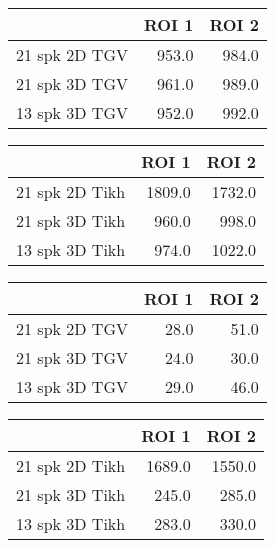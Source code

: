\begin{tabular}{lrr}
\toprule
{} &  ROI 1 &  ROI 2 \\
\midrule
21 spk 2D TGV &  953.0 &  984.0 \\
21 spk 3D TGV &  961.0 &  989.0 \\
13 spk 3D TGV &  952.0 &  992.0 \\
\bottomrule
\end{tabular}
\begin{tabular}{lrr}
\toprule
{} &   ROI 1 &   ROI 2 \\
\midrule
21 spk 2D Tikh &  1809.0 &  1732.0 \\
21 spk 3D Tikh &   960.0 &   998.0 \\
13 spk 3D Tikh &   974.0 &  1022.0 \\
\bottomrule
\end{tabular}
\begin{tabular}{lrr}
\toprule
{} &  ROI 1 &  ROI 2 \\
\midrule
21 spk 2D TGV &   28.0 &   51.0 \\
21 spk 3D TGV &   24.0 &   30.0 \\
13 spk 3D TGV &   29.0 &   46.0 \\
\bottomrule
\end{tabular}
\begin{tabular}{lrr}
\toprule
{} &   ROI 1 &   ROI 2 \\
\midrule
21 spk 2D Tikh &  1689.0 &  1550.0 \\
21 spk 3D Tikh &   245.0 &   285.0 \\
13 spk 3D Tikh &   283.0 &   330.0 \\
\bottomrule
\end{tabular}
